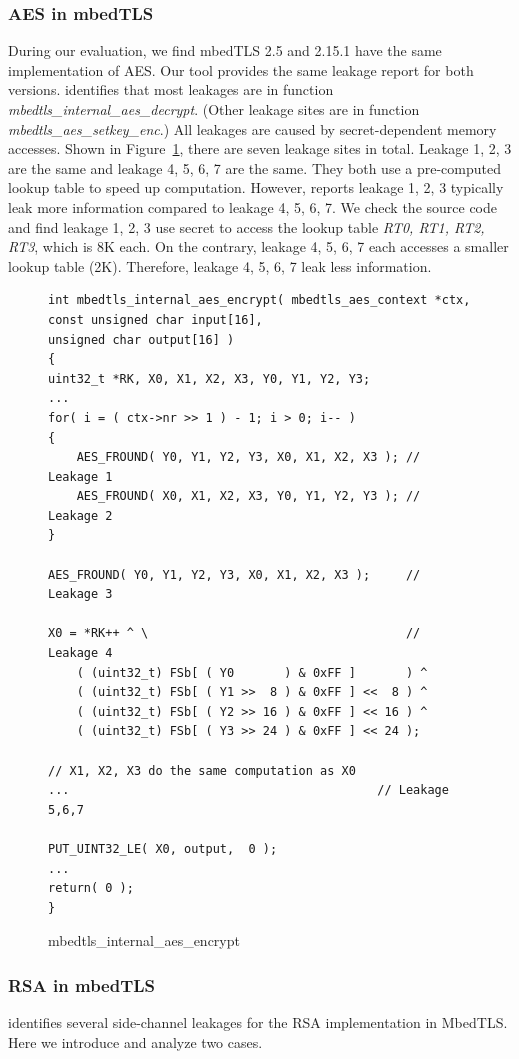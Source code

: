 \subsubsection{AES in mbedTLS} 
During our evaluation, we find mbedTLS 2.5 and 2.15.1 have
the same implementation of AES\@. Our tool provides the same leakage report
for both versions. \tool{} identifies that most leakages are in 
function \emph{mbedtls\_internal\_aes\_decrypt}. (Other leakage sites are
in function \emph{mbedtls\_aes\_setkey\_enc}.) All leakages
are caused by secret-dependent memory accesses. 
Shown in Figure~\ref{mbedtls_aes}, there are seven leakage sites in 
total. Leakage 1, 2, 3 are the same and leakage 4, 5, 6, 7 are the 
same. They both use a pre-computed lookup table to speed up computation.
However, \tool{} reports leakage 1, 2, 3 typically leak more information compared
to leakage 4, 5, 6, 7. We check the source code and find leakage 1, 2, 3 
use secret to access the lookup table \emph{RT0, RT1, RT2, RT3}, which
is 8K each. On the contrary, leakage 4, 5, 6, 7 each accesses a smaller lookup table (2K).
Therefore, leakage 4, 5, 6, 7 leak less information.
\begin{figure}[h!]
    \centering
\begin{lstlisting}[xleftmargin=.02\textwidth,xrightmargin=.01\textwidth]
int mbedtls_internal_aes_encrypt( mbedtls_aes_context *ctx,
const unsigned char input[16],
unsigned char output[16] )
{
uint32_t *RK, X0, X1, X2, X3, Y0, Y1, Y2, Y3;
...
for( i = ( ctx->nr >> 1 ) - 1; i > 0; i-- )
{
    AES_FROUND( Y0, Y1, Y2, Y3, X0, X1, X2, X3 ); // Leakage 1
    AES_FROUND( X0, X1, X2, X3, Y0, Y1, Y2, Y3 ); // Leakage 2
}

AES_FROUND( Y0, Y1, Y2, Y3, X0, X1, X2, X3 );     // Leakage 3

X0 = *RK++ ^ \                                    // Leakage 4
    ( (uint32_t) FSb[ ( Y0       ) & 0xFF ]       ) ^
    ( (uint32_t) FSb[ ( Y1 >>  8 ) & 0xFF ] <<  8 ) ^
    ( (uint32_t) FSb[ ( Y2 >> 16 ) & 0xFF ] << 16 ) ^
    ( (uint32_t) FSb[ ( Y3 >> 24 ) & 0xFF ] << 24 );

// X1, X2, X3 do the same computation as X0
...                                           // Leakage 5,6,7

PUT_UINT32_LE( X0, output,  0 );
...
return( 0 );
}
\end{lstlisting}
\caption{mbedtls\_internal\_aes\_encrypt}
\label{mbedtls_aes}
\end{figure}

\subsubsection{RSA in mbedTLS}
\tool{} identifies several side-channel leakages for the RSA implementation
in MbedTLS. Here we introduce and analyze two cases. 

